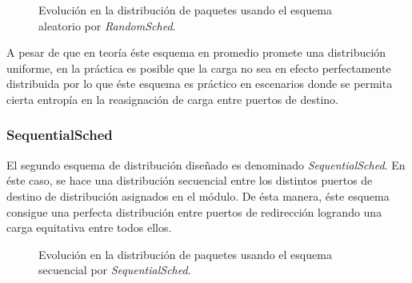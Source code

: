 \begin{figure}[th!]
\centering
{}
\caption{Evolución en la distribución de paquetes usando el esquema aleatorio por \emph{RandomSched}.}
\label{fig:RandomSched}
\end{figure}

A pesar de que en teoría éste esquema en promedio promete una distribución uniforme, en la práctica es posible que la carga no sea en efecto perfectamente distribuida por lo que éste esquema es práctico en escenarios donde se permita cierta entropía en la reasignación de carga entre puertos de destino.

\subsubsection{SequentialSched}
El segundo esquema de distribución diseñado es denominado \emph{SequentialSched}. En éste caso, se hace una distribución secuencial entre los distintos puertos de destino de distribución asignados en el módulo. De ésta manera, éste esquema consigue una perfecta distribución entre puertos de redirección logrando una carga equitativa entre todos ellos.

\begin{figure}[th!]
\centering
{}
\caption{Evolución en la distribución de paquetes usando el esquema secuencial por \emph{SequentialSched}.}
\label{fig:SequentialSched}
\end{figure}

